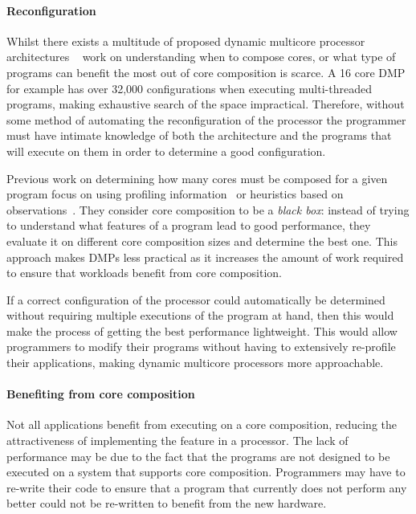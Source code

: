 \paragraph*{Reconfiguration}
Whilst there exists a multitude of proposed dynamic multicore processor architectures ~\cite{MittalSurv2016} work on understanding when to compose cores, or what type of programs can benefit the most out of core composition is scarce.
A 16 core DMP for example has over 32,000 configurations when executing multi-threaded programs, making exhaustive search of the space impractical.
Therefore, without some method of automating the reconfiguration of the processor the programmer must have intimate knowledge of both the architecture and the programs that will execute on them in order to determine a good configuration.

Previous work on determining how many cores must be composed for a given program focus on using profiling information~\cite{pricopiSchedCoreComp2014} or heuristics based on observations~\cite{gulati2008multitaskingdmc}.
They consider core composition to be a \textit{black box}: instead of trying to understand what features of a program lead to good performance, they evaluate it on different core composition sizes and determine the best one.
This approach makes DMPs less practical as it increases the amount of work required to ensure that workloads benefit from core composition.

If a correct configuration of the processor could automatically be determined without requiring multiple executions of the program at hand, then this would make the process of getting the best performance lightweight.
This would allow programmers to modify their programs without having to extensively re-profile their applications, making dynamic multicore processors more approachable.

\paragraph*{Benefiting from core composition}
Not all applications benefit from executing on a core composition, reducing the attractiveness of implementing the feature in a processor.
The lack of performance may be due to the fact that the programs are not designed to be executed on a system that supports core composition.
Programmers may have to re-write their code to ensure that a program that currently does not perform any better could not be re-written to benefit from the new hardware.

